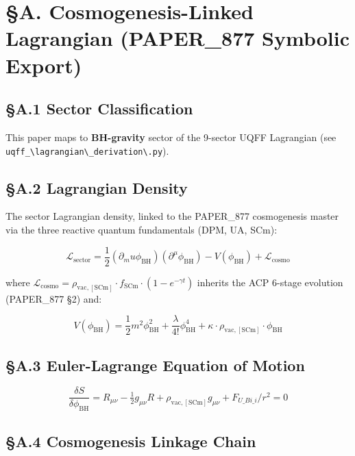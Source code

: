 \documentclass[12pt,a4paper]{article}
\begin{document}
\section{\S{}A. Cosmogenesis-Linked Lagrangian (PAPER\_877 Symbolic Export)}

\subsection{\S{}A.1 Sector Classification}

This paper maps to \textbf{BH-gravity} sector of the 9-sector UQFF Lagrangian (see \texttt{uqff\_\textbackslash {lagrangian\textbackslash \_derivation\textbackslash }.py}).

\subsection{\S{}A.2 Lagrangian Density}

The sector Lagrangian density, linked to the PAPER\_877 cosmogenesis master via the three reactive quantum fundamentals (DPM, UA, SCm):

\begin{equation}
\mathcal{L}_{\mathrm{sector}} = \frac{1}{2}(\partial_mu \phi_{\mathrm{BH}})(\partial^\mu \phi_{\mathrm{BH}}) - V(\phi_{\mathrm{BH}}) + \mathcal{L}_{\mathrm{cosmo}}
\end{equation}

where $\mathcal{L}_{\mathrm{cosmo}} = \rho_{\mathrm{vac,[SCm]}} \cdot f_{\mathrm{SCm}} \cdot (1 - e^{-\gamma t})$ inherits the ACP 6-stage evolution (PAPER\_877 \S{}2) and:

\begin{equation}
V(\phi_{\mathrm{BH}}) = \frac{1}{2} m^2 \phi_{\mathrm{BH}}^2 + \frac{\lambda}{4!} \phi_{\mathrm{BH}}^4 + \kappa \cdot \rho_{\mathrm{vac,[SCm]}} \cdot \phi_{\mathrm{BH}}
\end{equation}

\subsection{\S{}A.3 Euler-Lagrange Equation of Motion}

\begin{equation}
\boxed{\frac{\delta S}{\delta \phi_{\mathrm{BH}}} = R_{\mu\nu} - \tfrac{1}{2}g_{\mu\nu}R + \rho_{\mathrm{vac,[SCm]}} g_{\mu\nu} + F_{U\_Bi\_i}/r^2 = 0}
\end{equation}

\subsection{\S{}A.4 Cosmogenesis Linkage Chain}
\end{document}
